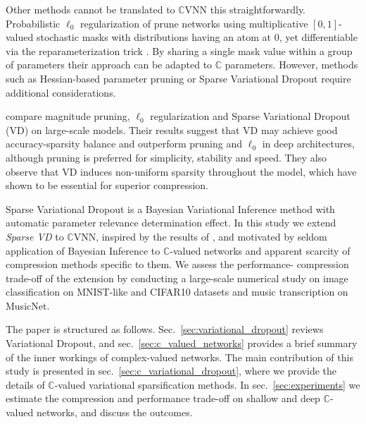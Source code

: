 \documentclass{article}
\newcommand{\cplx}{\mathbb{C}}
\begin{document}
Other methods cannot be translated to $\cplx$VNN this straightforwardly. Probabilistic
$\ell_0$ regularization of \citet{louizos_learning_2018} prune networks using multiplicative
$[0, 1]$-valued stochastic masks with distributions having an atom at $0$, yet differentiable
via the reparameterization trick \citep{kingma_auto-encoding_2014}. By sharing a single mask
value within a group of parameters their approach can be adapted to $\cplx$ parameters.
However, methods such as Hessian-based parameter pruning \citep{lecun_optimal_1990}
or Sparse Variational Dropout \citep{molchanov_variational_2017} require additional
considerations.

\citet{gale_state_2019} compare magnitude pruning, $\ell_0$ regularization and Sparse
Variational Dropout (VD) on large-scale models. Their results suggest that VD may achieve
good accuracy-sparsity balance and outperform pruning and $\ell_0$ in deep architectures,
although pruning is preferred for simplicity, stability and speed. They also observe that
VD induces non-uniform sparsity throughout the model, which \citet{he_amc:_2018} have shown
to be essential for superior compression.

Sparse Variational Dropout is a Bayesian Variational Inference method with automatic
parameter relevance determination effect. In this study we extend \emph{Sparse VD} to
$\cplx$VNN, inspired by the results of \citet{gale_state_2019}, and motivated by seldom
application of Bayesian Inference to $\cplx$-valued networks \citep{popa_complex-valued_2017}
and apparent scarcity of compression methods specific to them. We assess the performance-%
compression trade-off of the extension by conducting a large-scale numerical study on
image classification on MNIST-like and CIFAR10 datasets and music transcription on MusicNet.

The paper is structured as follows. Sec.~\ref{sec:variational_dropout} reviews Variational
Dropout, and sec.~\ref{sec:c_valued_networks} provides a brief summary of the inner
workings of complex-valued networks. The main contribution of this study is presented
in sec.~\ref{sec:c_variational_dropout}, where we provide the details of $\cplx$-valued
variational sparsification methods. In sec.~\ref{sec:experiments} we estimate the compression
and performance trade-off on shallow and deep $\cplx$-valued networks, and discuss the
outcomes.
\end{document}
